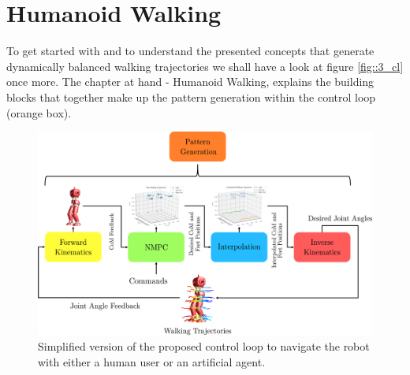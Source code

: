 \section{Humanoid Walking}
\label{sec::31_hw}
To get started with and to understand the presented concepts that generate dynamically balanced walking trajectories we shall have a look at figure \ref{fig::3_cl} once more. The chapter at hand - Humanoid Walking, explains the building blocks that together make up the pattern generation within the control loop (orange box).
\begin{figure}[h]
	\centering
	\includegraphics[scale=.5]{chapters/03_background/img/pattern_generation.png}
	\caption{\label{fig::31_pg} Simplified version of the proposed control loop to navigate the robot with either a human user or an artificial agent.}
\end{figure}
